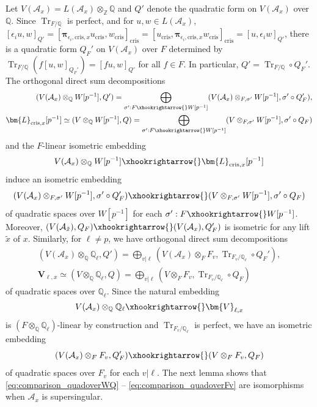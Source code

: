 \documentclass{amsart}
\numberwithin{equation}{subsection}
\numberwithin{theorem}{section}
\theoremstyle{definition}
\theoremstyle{remark}
\newcommand{\bQ}{\mathbb{Q}}
\newcommand{\bZ}{\mathbb{Z}}
\newcommand{\cA}{\mathcal{A}}
\newcommand{\cris}{_{\mathrm{cris}}}
\DeclareMathOperator{\Tr}{Tr}
\begin{document}
Let $V(\cA_x) = L(\cA_x)\otimes_{\bZ}\bQ$ and $Q'$ denote the quadratic form on $V(\cA_x)$ over $\bQ$. Since $\Tr_{F/\bQ}$ is perfect, and for $u,w\in L(\cA_x)$, $[\epsilon_iu, w]_{Q'} =[\bm{\pi}_{\epsilon_i, \mathrm{cris},x} u\cris,w\cris]\cris = [u\cris, \bm{\pi}_{\epsilon_i, \mathrm{cris},x} w\cris]\cris = [u, \epsilon_i w]_{Q'}$, there is a quadratic form $Q_F'$ on $V(\mathcal{A}_x)$ over $F$ determined by $\Tr_{F/\bQ}(f[u,w]_{Q_F'}) = [fu,w]_{Q'}$ for all $f\in F$. In particular, $Q' = \Tr_{F/\bQ}\circ Q_F'$. The orthogonal direct sum decompositions \begin{align*}
        (V(\cA_x)\otimes_{\bQ} W[p^{-1}], Q') = \bigoplus_{\sigma':F\xhookrightarrow{} W[p^{-1}]} (V(\cA_x)\otimes_{F, \sigma'}W[p^{-1}], \sigma'\circ Q_F'), \\
        \bm{L}_{\mathrm{cris}, x} [p^{-1}]\simeq  (V\otimes_{\bQ} W[p^{-1}], Q)=\bigoplus_{\sigma':F\xhookrightarrow{}W[p^{-1}]}(V\otimes_{F, \sigma'} W[p^{-1}], \sigma'\circ Q_F)
\end{align*} and the $F$-linear isometric embedding \begin{equation}\label{eq:comparison_quadoverWQ}
        V(\cA_x) \otimes_{\bQ}W[p^{-1}]\xhookrightarrow{} \bm{L}_{\mathrm{cris},x}[p^{-1}]
    \end{equation}induce an isometric embedding \begin{equation}\label{eq:comparison_quadoverW}
        (V(\cA_x)\otimes_{F, \sigma'} W[p^{-1}], \sigma'\circ Q_F') \xhookrightarrow{} (V\otimes_{F, \sigma'}W[p^{-1}], \sigma'\circ Q_F)
    \end{equation}of quadratic spaces over $W[p^{-1}]$ for each $\sigma': F\xhookrightarrow{}W[p^{-1}]$. Moreover, $(V(\cA_{\tilde{x}}), Q_F) \xhookrightarrow{}(V(\cA_{x}), Q_F')$ is isometric for any lift $\tilde{x}$ of $x$. 
    Similarly, for $\ell\neq p$, we have orthogonal direct sum decompositions \begin{align*}
        (V(\cA_x)\otimes_{\bQ} \bQ_\ell, Q') = \bigoplus_{v|\ell} (V(\cA_x)\otimes_{F}F_v, \Tr_{F_v/\bQ_\ell}\circ Q_F'), \\
        \bm{V}_{\ell, x} \simeq  (V\otimes_{\bQ} \bQ_\ell, Q)=\bigoplus_{v|\ell}(V\otimes_{F} F_v, \Tr_{F_v/\bQ_\ell}\circ Q_F)
    \end{align*} of quadratic spaces over $\bQ_\ell$. Since the natural embedding \begin{equation}\label{eq:comaprison_quadoverQl}
        V(\cA_x) \otimes_{\bQ} \bQ_\ell\xhookrightarrow{} \bm{V}_{\ell,x}
    \end{equation} is $(F\otimes_{\bQ}\bQ_\ell)$-linear by construction and $\Tr_{F_v/\bQ_\ell}$ is perfect, we have an isometric embedding \begin{equation}\label{eq:comparison_quadoverFv}
        (V(\cA_x)\otimes_{F} F_v,  Q_F')\xhookrightarrow{} (V\otimes_{F}F_v,  Q_F)
    \end{equation} of quadratic spaces over $F_v$ for each $v|\ell$. The next lemma shows that \eqref{eq:comparison_quadoverWQ} -- \eqref{eq:comparison_quadoverFv} are isomorphisms when $\cA_x$ is supersingular. 
    
\end{document}
